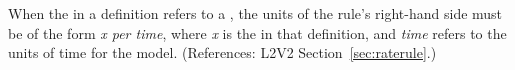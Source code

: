 When the  in a \RateRule definition refers to a \Parameter,
the units of the rule's right-hand side must be of the form \emph{x per
time}, where \emph{x} is the  in that \Parameter definition,
and \emph{time} refers to the units of time for the model.  (References:
L2V2 Section~\ref{sec:raterule}.)
